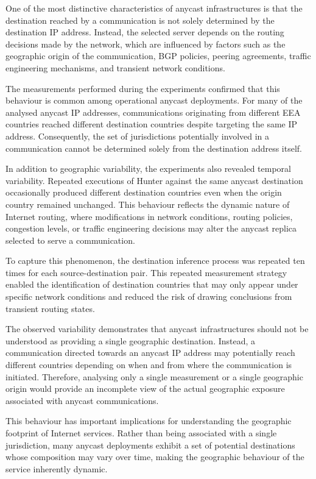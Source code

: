One of the most distinctive characteristics of anycast infrastructures is that the destination reached by a communication is not solely determined by the destination IP address. Instead, the selected server depends on the routing decisions made by the network, which are influenced by factors such as the geographic origin of the communication, BGP policies, peering agreements, traffic engineering mechanisms, and transient network conditions.

The measurements performed during the experiments confirmed that this behaviour is common among operational anycast deployments. For many of the analysed anycast IP addresses, communications originating from different EEA countries reached different destination countries despite targeting the same IP address. Consequently, the set of jurisdictions potentially involved in a communication cannot be determined solely from the destination address itself.

In addition to geographic variability, the experiments also revealed temporal variability. Repeated executions of Hunter against the same anycast destination occasionally produced different destination countries even when the origin country remained unchanged. This behaviour reflects the dynamic nature of Internet routing, where modifications in network conditions, routing policies, congestion levels, or traffic engineering decisions may alter the anycast replica selected to serve a communication.

To capture this phenomenon, the destination inference process was repeated ten times for each source-destination pair. This repeated measurement strategy enabled the identification of destination countries that may only appear under specific network conditions and reduced the risk of drawing conclusions from transient routing states.

The observed variability demonstrates that anycast infrastructures should not be understood as providing a single geographic destination. Instead, a communication directed towards an anycast IP address may potentially reach different countries depending on when and from where the communication is initiated. Therefore, analysing only a single measurement or a single geographic origin would provide an incomplete view of the actual geographic exposure associated with anycast communications.

This behaviour has important implications for understanding the geographic footprint of Internet services. Rather than being associated with a single jurisdiction, many anycast deployments exhibit a set of potential destinations whose composition may vary over time, making the geographic behaviour of the service inherently dynamic.

